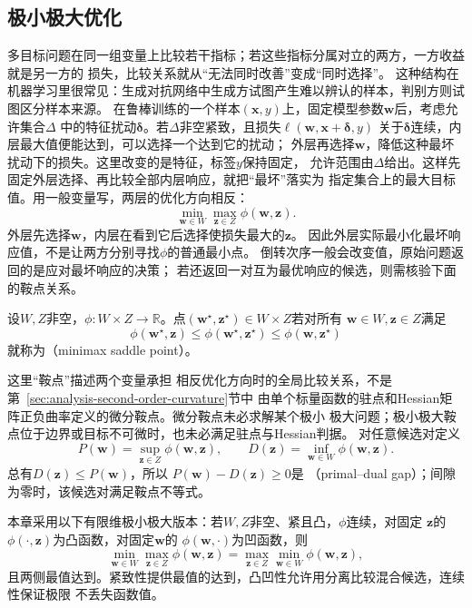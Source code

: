 \subsection{极小极大优化}
\label{sec:opt-minimax}

多目标问题在同一组变量上比较若干指标；若这些指标分属对立的两方，一方收益就是另一方的
损失，比较关系就从“无法同时改善”变成“同时选择”。
这种结构在机器学习里很常见：生成对抗网络中生成方试图产生难以辨认的样本，判别方则试图区分样本来源。
在鲁棒训练的一个样本$(\bm x,y)$上，固定模型参数$\bm w$后，考虑允许集合$\Delta$
中的特征扰动$\bm\delta$。若$\Delta$非空紧致，且损失$\ell(\bm w,\bm x+\bm\delta,y)$
关于$\bm\delta$连续，内层最大值便能达到，可以选择一个达到它的扰动；
外层再选择$\bm w$，降低这种最坏扰动下的损失。这里改变的是特征，标签$y$保持固定，
允许范围由$\Delta$给出。这样先固定外层选择、再比较全部内层响应，就把“最坏”落实为
指定集合上的最大目标值。用一般变量写，两层的优化方向相反：
\[
  \min_{\bm{w}\in W}\max_{\bm{z}\in Z}\phi(\bm{w},\bm{z}).
\]
外层先选择$\bm w$，内层在看到它后选择使损失最大的$\bm z$。
因此外层实际最小化最坏响应值，不是让两方分别寻找$\phi$的普通最小点。
倒转次序一般会改变值，原始问题返回的是应对最坏响应的决策；
若还返回一对互为最优响应的候选，则需核验下面的鞍点关系。
\begin{definition}[极小极大鞍点]
\label{def:opt-minimax-saddle}
设$W,Z$非空，$\phi:W\times Z\to\mathbb R$。点$(\bm w^\star,\bm z^\star)\in W\times Z$若对所有
$\bm w\in W,\bm z\in Z$满足
\[
  \phi(\bm{w}^{\star},\bm{z})
  \leq\phi(\bm{w}^{\star},\bm{z}^{\star})
  \leq\phi(\bm{w},\bm{z}^{\star})
\]
就称为（minimax saddle point）。
\end{definition}
这里“鞍点”描述两个变量承担
相反优化方向时的全局比较关系，不是第~\ref{sec:analysis-second-order-curvature}节中
由单个标量函数的驻点和Hessian矩阵正负曲率定义的微分鞍点。微分鞍点未必求解某个极小
极大问题；极小极大鞍点位于边界或目标不可微时，也未必满足驻点与Hessian判据。
对任意候选对定义
\[
  P(\bm{w})=\sup_{\bm{z}\in Z}\phi(\bm{w},\bm{z}),\qquad
  D(\bm{z})=\inf_{\bm{w}\in W}\phi(\bm{w},\bm{z}).
\]
总有$D(\bm{z})\leq P(\bm{w})$，所以
$P(\bm{w})-D(\bm{z})\geq0$是
（primal--dual gap）；间隙为零时，该候选对满足鞍点不等式。

本章采用以下有限维极小极大版本：若$W,Z$非空、紧且凸，$\phi$连续，对固定
$\bm{z}$的$\phi(\cdot,\bm{z})$为凸函数，对固定$\bm{w}$的
$\phi(\bm{w},\cdot)$为凹函数，则
\[
  \min_{\bm{w}\in W}\max_{\bm{z}\in Z}\phi(\bm{w},\bm{z})
  =
  \max_{\bm{z}\in Z}\min_{\bm{w}\in W}\phi(\bm{w},\bm{z}),
\]
且两侧最值达到。紧致性提供最值的达到，凸凹性允许用分离比较混合候选，连续性保证极限
不丢失函数值。

